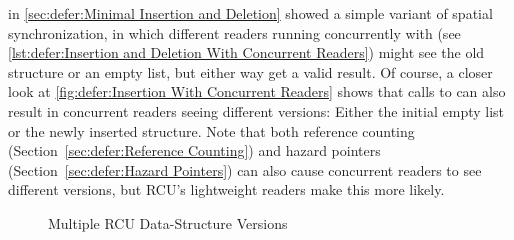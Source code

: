 in
\cref{sec:defer:Minimal Insertion and Deletion}
showed a simple variant of spatial synchronization, in which different
readers running concurrently with 
(see \cref{lst:defer:Insertion and Deletion With Concurrent Readers})
might see the old  structure or an empty list, but either
way get a valid result.
Of course, a closer look at
\cref{fig:defer:Insertion With Concurrent Readers}
shows that calls to  can also result in concurrent
readers seeing different versions: Either the initial empty list
or the newly inserted  structure.
Note that both reference counting
(Section~\ref{sec:defer:Reference Counting})
and hazard pointers
(Section~\ref{sec:defer:Hazard Pointers})
can also cause concurrent readers to see different versions, but
RCU's lightweight readers make this more likely.

\begin{figure}
\centering
{}
\caption{Multiple RCU Data-Structure Versions}
\label{fig:defer:Multiple RCU Data-Structure Versions}
\end{figure}

